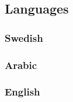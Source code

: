 \documentclass{article}
\begin{document}
\begin{multicols}{2}
        \subsection{Languages}
            \subsubsection{Swedish}
            \subsubsection{Arabic}
            \subsubsection{English}
    \end{multicols}
\end{document}
